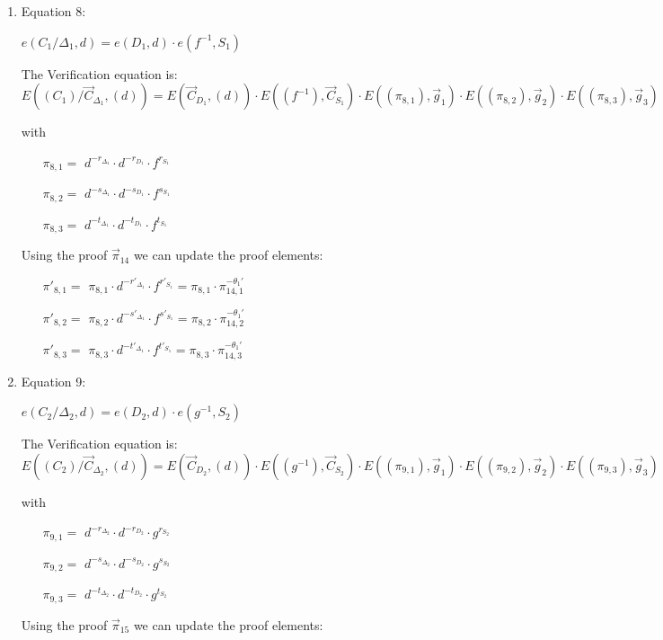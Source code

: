 \begin{description}
\begin{enumerate}
\begin{enumerate}
      
    \item Equation 8:

      $e(C_1/\boxed{\Delta_1}, d) = e (\boxed{D_1},d) \cdot e(f^{-1}, \boxed{S_1})$

      The Verification equation is: $ E((C_1)/\vec{C}_{\Delta_1}, (d)) = E(\vec{C}_{D_1},(d)) \cdot E((f^{-1}), \vec{C}_{S_1})\cdot E((\pi_{8,1}), \vec{g}_1)\cdot E((\pi_{8,2}), \vec{g}_2)\cdot E((\pi_{8,3}), \vec{g}_3)$

      with
      \begin{itemize}
      \item[$\pi_{8,1} = $] $d^{-r_{\Delta_1}} \cdot d^{-r_{D_1}} \cdot f^{r_{S_1}}$
      \item[$\pi_{8,2} = $] $d^{-s_{\Delta_1}} \cdot d^{-s_{D_1}} \cdot f^{s_{S_1}}$
      \item[$\pi_{8,3} = $] $d^{-t_{\Delta_1}} \cdot d^{-t_{D_1}} \cdot f^{t_{S_1}}$
      \end{itemize}
      Using the proof $\vec{\pi}_{14}$ we can update the proof elements:
      \begin{itemize}
      \item[$\pi'_{8,1} = $] $\pi_{8,1} \cdot d^{-r'_{\Delta_1}} \cdot f^{r'_{S_1}} = \pi_{8,1} \cdot \pi_{14,1}^{-\theta_1'}$
      \item[$\pi'_{8,2} = $] $\pi_{8,2} \cdot d^{-s'_{\Delta_1}} \cdot f^{s'_{S_1}} = \pi_{8,2} \cdot \pi_{14,2}^{-\theta_1'}$
      \item[$\pi'_{8,3} = $] $\pi_{8,3} \cdot d^{-t'_{\Delta_1}} \cdot f^{t'_{S_1}} = \pi_{8,3} \cdot \pi_{14,3}^{-\theta_1'}$
      \end{itemize}

    \item Equation 9:

      $e(C_2/\boxed{\Delta_2}, d) = e (\boxed{D_2},d) \cdot e(g^{-1}, \boxed{S_2})$

      The Verification equation is: $ E((C_2)/\vec{C}_{\Delta_2}, (d)) = E(\vec{C}_{D_2},(d)) \cdot E((g^{-1}), \vec{C}_{S_2})\cdot E((\pi_{9,1}), \vec{g}_1)\cdot E((\pi_{9,2}), \vec{g}_2)\cdot E((\pi_{9,3}), \vec{g}_3)$

      with
      \begin{itemize}
      \item[$\pi_{9,1} = $] $d^{-r_{\Delta_2}} \cdot d^{-r_{D_2}} \cdot g^{r_{S_2}}$
      \item[$\pi_{9,2} = $] $d^{-s_{\Delta_2}} \cdot d^{-s_{D_2}} \cdot g^{s_{S_2}}$
      \item[$\pi_{9,3} = $] $d^{-t_{\Delta_2}} \cdot d^{-t_{D_2}} \cdot g^{t_{S_2}}$
      \end{itemize}
      Using the proof $\vec{\pi}_{15}$ we can update the proof elements:
      

\end{enumerate}
\end{enumerate}
\end{description}
